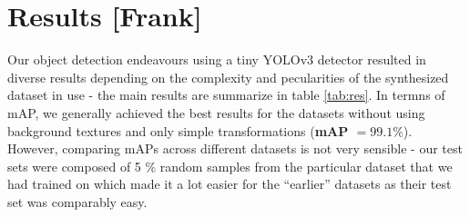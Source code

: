 \documentclass[a4paper]{article}
\begin{document}
\section{Results [Frank]}
Our object detection endeavours using a tiny YOLOv3 detector resulted in diverse results depending on the complexity and pecularities of the synthesized dataset in use - the main results are summarize in table \ref{tab:res}. In termns of mAP, we generally achieved the best results for the datasets without using background textures and only simple transformations (\textbf{mAP $=99.1 \%$}). However, comparing mAPs across different datasets is not very sensible - our test sets were composed of 5 \% random samples from the particular dataset that we had trained on which made it a lot easier for the ``earlier'' datasets as their test set was comparably easy.
\end{document}
